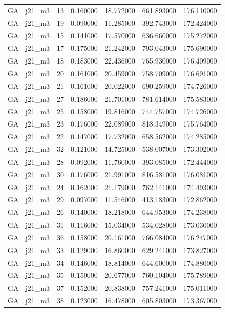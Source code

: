 \begin{tabular}{llrrrrr}
GA & j21_m3 & 13 & 0.160000 & 18.772000 & 661.893000 & 176.110000 \\
GA & j21_m3 & 19 & 0.090000 & 11.285000 & 392.743000 & 172.424000 \\
GA & j21_m3 & 15 & 0.141000 & 17.570000 & 636.660000 & 175.272000 \\
GA & j21_m3 & 17 & 0.175000 & 21.242000 & 793.043000 & 175.690000 \\
GA & j21_m3 & 18 & 0.183000 & 22.436000 & 765.930000 & 176.409000 \\
GA & j21_m3 & 20 & 0.161000 & 20.459000 & 758.709000 & 176.691000 \\
GA & j21_m3 & 21 & 0.161000 & 20.022000 & 690.259000 & 174.726000 \\
GA & j21_m3 & 27 & 0.186000 & 21.701000 & 781.614000 & 175.583000 \\
GA & j21_m3 & 25 & 0.158000 & 19.816000 & 744.757000 & 174.726000 \\
GA & j21_m3 & 23 & 0.176000 & 22.089000 & 818.349000 & 175.764000 \\
GA & j21_m3 & 22 & 0.147000 & 17.732000 & 658.562000 & 174.285000 \\
GA & j21_m3 & 32 & 0.121000 & 14.725000 & 538.007000 & 173.302000 \\
GA & j21_m3 & 28 & 0.092000 & 11.760000 & 393.085000 & 172.444000 \\
GA & j21_m3 & 30 & 0.176000 & 21.991000 & 816.581000 & 176.081000 \\
GA & j21_m3 & 24 & 0.162000 & 21.179000 & 762.141000 & 174.493000 \\
GA & j21_m3 & 29 & 0.097000 & 11.546000 & 413.183000 & 172.862000 \\
GA & j21_m3 & 26 & 0.140000 & 18.218000 & 644.953000 & 174.238000 \\
GA & j21_m3 & 31 & 0.116000 & 15.034000 & 534.028000 & 173.030000 \\
GA & j21_m3 & 36 & 0.158000 & 20.161000 & 766.084000 & 176.247000 \\
GA & j21_m3 & 33 & 0.129000 & 16.860000 & 629.241000 & 173.827000 \\
GA & j21_m3 & 34 & 0.146000 & 18.814000 & 644.600000 & 174.880000 \\
GA & j21_m3 & 35 & 0.150000 & 20.677000 & 760.104000 & 175.789000 \\
GA & j21_m3 & 37 & 0.152000 & 20.838000 & 757.241000 & 175.011000 \\
GA & j21_m3 & 38 & 0.123000 & 16.478000 & 605.803000 & 173.367000 \\

\end{tabular}
